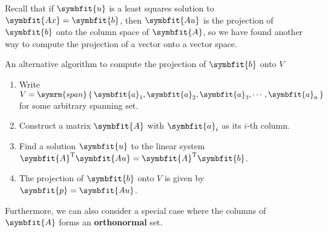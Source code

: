 \documentclass[math]{amznotes}
\theoremstyle{remark}
\begin{document}
Recall that if $\symbfit{u}$ is a least squares solution to $\symbfit{Ax} = \symbfit{b}$, then $\symbfit{Au}$ is the projection of $\symbfit{b}$ onto the column space of $\symbfit{A}$, so we have found another way to compute the projection of a vector onto a vector space.
\begin{genbox}{An alternative algorithm to compute the projection of $\symbfit{b}$ onto $V$}
    \begin{enumerate}
        \item Write $V =\symrm{span}\left\{ \, \symbfit{a}_1, \symbfit{a}_2, \symbfit{a}_3, \cdots, \symbfit{a}_n \, \right\}$ for some arbitrary spanning set.
        \item Construct a matrix $\symbfit{A}$ with $\symbfit{a}_i$ as its $i$-th column.
        \item Find a solution $\symbfit{u}$ to the linear system $\symbfit{A}^{\mathrm{T}}\symbfit{Au} = \symbfit{A}^{\mathrm{T}}\symbfit{b}$.
        \item The projection of $\symbfit{b}$ onto $V$ is given by $\symbfit{p} = \symbfit{Au}$.
    \end{enumerate}
\end{genbox}
Furthermore, we can also consider a special case where the columns of $\symbfit{A}$ forms an {\color{red} \textbf{orthonormal}} set.
\end{document}
